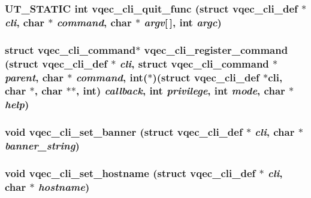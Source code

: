 \subsubsection{\setlength{\rightskip}{0pt plus 5cm}UT\_\-STATIC int vqec\_\-cli\_\-quit\_\-func (struct \bf{vqec\_\-cli\_\-def} $\ast$ {\em cli}, char $\ast$ {\em command}, char $\ast$ {\em argv}[$\,$], int {\em argc})}\label{vqec__cli_8c_9ead6d14fa2fd77cac5f036207bccf13}


\subsubsection{\setlength{\rightskip}{0pt plus 5cm}struct \bf{vqec\_\-cli\_\-command}$\ast$ vqec\_\-cli\_\-register\_\-command (struct \bf{vqec\_\-cli\_\-def} $\ast$ {\em cli}, struct \bf{vqec\_\-cli\_\-command} $\ast$ {\em parent}, char $\ast$ {\em command}, int($\ast$)(struct \bf{vqec\_\-cli\_\-def} $\ast$cli, char $\ast$, char $\ast$$\ast$, int) {\em callback}, int {\em privilege}, int {\em mode}, char $\ast$ {\em help})}\label{vqec__cli_8c_282f683d908651648579da4513ff2831}


\subsubsection{\setlength{\rightskip}{0pt plus 5cm}void vqec\_\-cli\_\-set\_\-banner (struct \bf{vqec\_\-cli\_\-def} $\ast$ {\em cli}, char $\ast$ {\em banner\_\-string})}\label{vqec__cli_8c_6980efa6b123273643063d49433fd04d}


\subsubsection{\setlength{\rightskip}{0pt plus 5cm}void vqec\_\-cli\_\-set\_\-hostname (struct \bf{vqec\_\-cli\_\-def} $\ast$ {\em cli}, char $\ast$ {\em hostname})}\label{vqec__cli_8c_41aa16aea4996aa1a68882a81166dfca}


